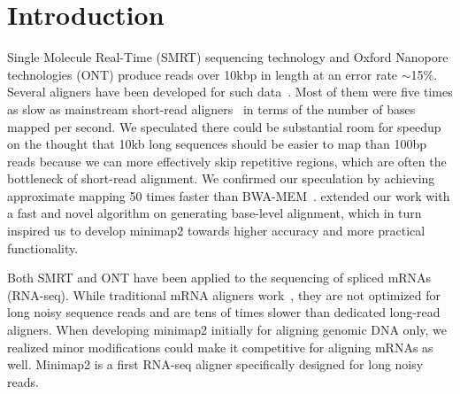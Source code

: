 \documentclass{bioinfo}
\begin{document}
\section{Introduction}

Single Molecule Real-Time (SMRT) sequencing technology and Oxford Nanopore
technologies (ONT) produce reads over 10kbp in length at an error rate
$\sim$15\%. Several aligners have been developed for such
data~\citep{Chaisson:2012aa,Li:2013aa,Liu:2016ab,Sovic:2016aa,Liu:2017aa,Lin:2017aa,Sedlazeck169557}.
Most of them were five times as slow as mainstream short-read
aligners~\citep{Langmead:2012fk,Li:2013aa} in terms of the number of bases
mapped per second. We speculated there could be substantial room for speedup on
the thought that 10kb long sequences should be easier to map than 100bp reads
because we can more effectively skip repetitive regions, which are often the
bottleneck of short-read alignment. We confirmed our speculation by achieving
approximate mapping 50 times faster than BWA-MEM~\citep{Li:2016aa}.
\citet{Suzuki130633} extended our work with a fast and novel algorithm on
generating base-level alignment, which in turn inspired us to develop minimap2
towards higher accuracy and more practical functionality.

Both SMRT and ONT have been applied to the sequencing of spliced mRNAs (RNA-seq). While
traditional mRNA aligners work~\citep{Wu:2005vn,Iwata:2012aa}, they are not
optimized for long noisy sequence reads and are tens of times slower than
dedicated long-read aligners. When developing minimap2 initially for aligning
genomic DNA only, we realized minor modifications could make it competitive for
aligning mRNAs as well. Minimap2 is a first RNA-seq aligner specifically
designed for long noisy reads.
\end{document}
